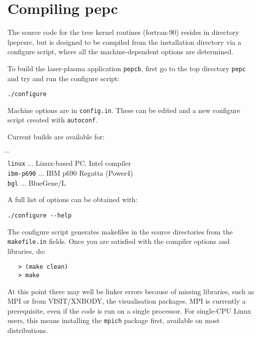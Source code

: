 \documentclass[11pt,psfig]{article}
\begin{document}
\section{Compiling {\sc pepc}} 

The source code for the tree kernel routines (fortran-90) resides in directory
lpepcsrc, but is designed to be compiled from the installation directory via a configure script, where all the machine-dependent options are determined.

\medskip\noindent
To build the laser-plasma application {\tt pepcb}, first go to the top directory
{\tt pepc} and try and run the configure script:

\begin{verbatim}
./configure
\end{verbatim}

Machine options are in \texttt{config.in}.  These can be edited and a new configure script created with \texttt{autoconf}.

Current builds are available for:
\begin{tabbing}
\hspace{1cm} \= \hspace{3cm} \= \hspace{1cm} \=\\
\> \texttt{linux} \> ... \> Linux-based PC, Intel compiler\\
\> \texttt{ibm-p690} \> ... \> IBM p690 Regatta (Power4)\\
\> \texttt{bgl} \> ... \> BlueGene/L \\
\end{tabbing}

A full list of options can be obtained with:
\begin{verbatim}
./configure --help
\end{verbatim}

The configure script generates makefiles in the source directories from the \texttt{makefile.in} fields.  Once you are satisfied with the compiler options and libraries, do:

\begin{verbatim}
   > (make clean)
   > make
\end{verbatim}


\medskip\noindent
At this point there may well be linker errors because of missing
libraries, such as MPI or from VISIT/XNBODY, the visualisation packages.  MPI is
currently a prerequisite, even if the code is run on a single processor.  For
single-CPU Linux users, this means installing the {\tt mpich} package first, available on
most distributions. 
\end{document}

